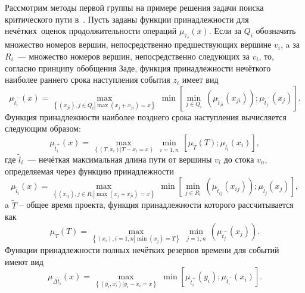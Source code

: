 Рассмотрим методы первой группы на примере решения задачи поиска критического пути в~\cite{Balashov_IPU}. Пусть заданы функции принадлежности для нечётких~оценок продолжительности операций $\mu_{\tilde \tau_s}\left( x \right)$. Если за $Q_i$ обозначить множество номеров вершин, непосредственно предшествующих вершине $v_i$, a за $R_i$~--- множество номеров вершин, непосредственно следующих за $v_i$, то, согласно принципу обобщения Заде, функция принадлежности нечёткого наиболее раннего срока наступления события $z_i$ имеет вид
\begin{equation}
\label{eq:fcpm-zadeh-earliest}
  \mu_{\tilde{t}_{i}^{-}}\left( x \right)=\underset{\left\{ \left( x_{ji} \right),j\in Q_i \left| \max \left( x_j+x_{ji} \right)=x \right. \right\}}{\mathop{\max }}\,\min \left[ \underset{j\in Q_i}{\mathop{\min }}\,\left( \mu_{\tilde{t}_{ji}^{-}}\left( x_{ji} \right) \right);{\mu_{\tilde{t}_{j}^{-}}}\left(x_j \right) \right].
\end{equation}
Функция принадлежности наиболее позднего срока наступления вычисляется следующим образом:
\begin{equation}
  \mu_{\tilde{t}_{i}^{+}}\left( x \right)=\underset{\left\{ \left( T,x_i \right)\left| T-x_i=x \right. \right\}}{\mathop{\max }}\,\underset{i=\overline{1,n}}{\mathop{\min }}\,\left[ \mu_{\tilde T}\left( T \right);\mu_{\tilde l_i}\left(x_i \right) \right],
\end{equation}
где $\tilde l_i$~--- нечёткая максимальная длина пути от вершины $v_i$ до стока $v_n$, определяемая через функцию принадлежности
\begin{equation}
  \mu_{\tilde l_i}\left( x \right)=\underset{\left\{ \left(x_{ij} \right),j\in R_i\left| \max \left( x_j+x_{ji} \right)=x \right. \right\}}{\mathop{\max }}\,\min \left[ \underset{j\in R_i}{\mathop{\min }}\,\left( \mu_{\tilde t_{ij}}\left( x_{ij} \right) \right);\mu_{\tilde l_j}\left(x_j \right) \right],
\end{equation}
a $\tilde T$ – общее время проекта, функция принадлежности которого рассчитывается как
\begin{equation}
  \mu_{\tilde T}\left( T \right)=\underset{\left\{ \left(x_i \right),i=\overline{1,n}\left| \min \left(x_j \right)=T \right. \right\}}{\mathop{\max }}\,\underset{j=\overline{1,n}}{\mathop{\min }}\,\left( \mu_{\tilde{t}_{j}^{-}}\left(x_j \right) \right).
\end{equation}
Функции принадлежности полных нечётких резервов времени для событий имеют вид
\begin{equation}
\label{eq:fcpm-event-reserves}
  \mu_{\Delta \tilde{t}_i}\left( x \right)=\underset{\left\{ \left( y_i, x_i \right)\left| y_i-x_i=x \right. \right\}}{\mathop{\max }}\,\min \left[ \mu_{\tilde{t}_{i}^{+}}\left(y_i \right); \mu_{\tilde{t}_{i}^{-}}\left(x_i \right) \right].
\end{equation}
	
